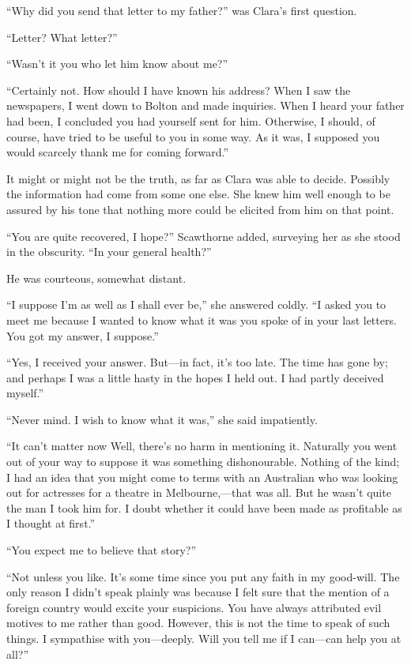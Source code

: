 ``Why did you send that letter to my father?'' was Clara's first
question.

``Letter? What letter?''

``Wasn't it you who let him know about me?''

{\protect\hypertarget{54}{}{}}``Certainly not. How should I have known
his address? When I saw the newspapers, I went down to Bolton and made
inquiries. When I heard your father had been, I concluded you had
yourself sent for him. Otherwise, I should, of course, have tried to be
useful to you in some way. As it was, I supposed you would scarcely
thank me for coming forward.''

It might or might not be the truth, as far as Clara was able to decide.
Possibly the information had come from some one else. She knew him well
enough to be assured by his tone that nothing more could be elicited
from him on that point.

``You are quite recovered, I hope?'' Scawthorne added, surveying her as
she stood in the obscurity. ``In your general health?''

He was courteous, somewhat distant.

``I suppose I'm as well as I shall ever be,'' she answered coldly. ``I
asked you to meet me because I wanted to know what it was you spoke of
in your last letters. You got my answer, I suppose.''

``Yes, I received your answer. But---in fact, it's too late. The time
has gone by; and {\protect\hypertarget{55}{}{}}perhaps I was a little
hasty in the hopes I held out. I had partly deceived myself.''

``Never mind. I wish to know what it was,'' she said impatiently.

``It can't matter now Well, there's no harm in mentioning it. Naturally
you went out of your way to suppose it was something dishonourable.
Nothing of the kind; I had an idea that you might come to terms with an
Australian who was looking out for actresses for a theatre in
Melbourne,---that was all. But he wasn't quite the man I took him for. I
doubt whether it could have been made as profitable as I thought at
first.''

``You expect me to believe that story?''

``Not unless you like. It's some time since you put any faith in my
good-will. The only reason I didn't speak plainly was because I felt
sure that the mention of a foreign country would excite your suspicions.
You have always attributed evil motives to me rather than good. However,
this is not the time to speak of such things. I sympathise with
you---deeply. Will you tell me if I can---can help you at all?''


